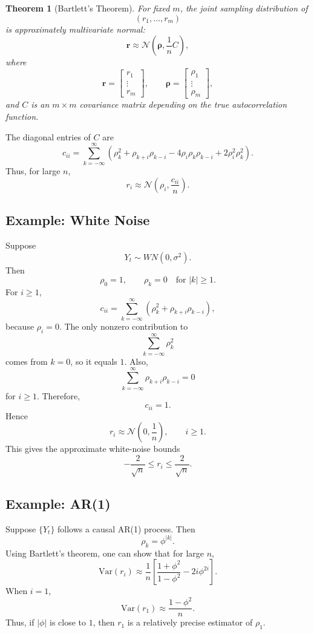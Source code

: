\documentclass[12pt,oneside]{book}
\numberwithin{equation}{section}
\theoremstyle{definition}
\theoremstyle{plain}
\newtheorem{theorem}{Theorem}[section]
\theoremstyle{remark}
\newcommand{\Var}{\mathrm{Var}}
\newcommand{\Normal}{\mathcal{N}}
\begin{document}
\begin{theorem}[Bartlett's Theorem]
For fixed $m$, the joint sampling distribution of
\[
(r_1,\ldots,r_m)
\]
is approximately multivariate normal:
\[
\bm{r}
\approx
\Normal\left(\bm{\rho},\frac{1}{n}C\right),
\]
where
\[
\bm{r}
=
\begin{bmatrix}
r_1\\
\vdots\\
r_m
\end{bmatrix},
\qquad
\bm{\rho}
=
\begin{bmatrix}
\rho_1\\
\vdots\\
\rho_m
\end{bmatrix},
\]
and $C$ is an $m\times m$ covariance matrix depending on the true autocorrelation function.
\end{theorem}

The diagonal entries of $C$ are
\[
c_{ii}
=
\sum_{k=-\infty}^{\infty}
\left(
\rho_k^2+\rho_{k+i}\rho_{k-i}
-4\rho_i\rho_k\rho_{k-i}
+2\rho_i^2\rho_k^2
\right).
\]
Thus, for large $n$,
\[
r_i\approx \Normal\left(\rho_i,\frac{c_{ii}}{n}\right).
\]

\subsection*{Example: White Noise}

Suppose
\[
Y_t\sim WN(0,\sigma^2).
\]
Then
\[
\rho_0=1,
\qquad
\rho_k=0
\quad
\text{for } |k|\geq 1.
\]
For $i\geq 1$,
\[
c_{ii}
=
\sum_{k=-\infty}^{\infty}
\left(
\rho_k^2+\rho_{k+i}\rho_{k-i}
\right),
\]
because $\rho_i=0$. The only nonzero contribution to
\[
\sum_{k=-\infty}^{\infty}\rho_k^2
\]
comes from $k=0$, so it equals $1$. Also,
\[
\sum_{k=-\infty}^{\infty}\rho_{k+i}\rho_{k-i}=0
\]
for $i\geq 1$. Therefore,
\[
c_{ii}=1.
\]
Hence
\[
r_i\approx \Normal\left(0,\frac{1}{n}\right),
\qquad i\geq 1.
\]
This gives the approximate white-noise bounds
\[
-\frac{2}{\sqrt{n}}
\leq
r_i
\leq
\frac{2}{\sqrt{n}}.
\]

\subsection{Example: AR(1)}

Suppose $\{Y_t\}$ follows a causal AR(1) process. Then
\[
\rho_k=\phi^{|k|}.
\]
Using Bartlett's theorem, one can show that for large $n$,
\[
\Var(r_i)
\approx
\frac{1}{n}
\left[
\frac{1+\phi^2}{1-\phi^2}
-
2i\phi^{2i}
\right].
\]
When $i=1$,
\[
\Var(r_1)
\approx
\frac{1-\phi^2}{n}.
\]
Thus, if $|\phi|$ is close to $1$, then $r_1$ is a relatively precise estimator of $\rho_1$.
\end{document}
